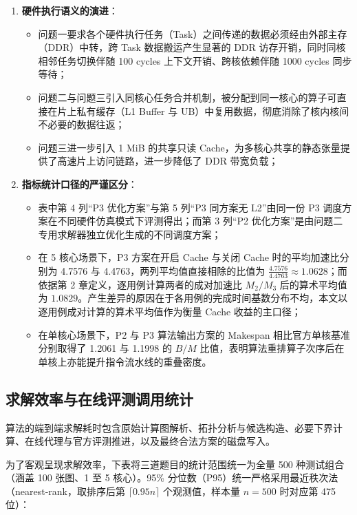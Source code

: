 \documentclass[anonymous,notoc]{gmcm2026}
\providecommand{\tightlist}{\setlength{\itemsep}{0pt}\setlength{\parskip}{0pt}}
\begin{document}
\begin{enumerate}
\def\labelenumi{\arabic{enumi}.}
\tightlist
\item
  \textbf{硬件执行语义的演进}：

  \begin{itemize}
  \tightlist
  \item
    问题一要求各个硬件执行任务（Task）之间传递的数据必须经由外部主存（DDR）中转，跨 Task 数据搬运产生显著的 DDR 访存开销，同时同核相邻任务切换伴随 100 cycles 上下文开销、跨核依赖伴随 1000 cycles 同步等待；
  \item
    问题二与问题三引入同核心任务合并机制，被分配到同一核心的算子可直接在片上私有缓存（L1 Buffer 与 UB）中复用数据，彻底消除了核内核间不必要的数据往返；
  \item
    问题三进一步引入 1 MiB 的共享只读 Cache，为多核心共享的静态张量提供了高速片上访问链路，进一步降低了 DDR 带宽负载；
  \end{itemize}
\item
  \textbf{指标统计口径的严谨区分}：

  \begin{itemize}
  \tightlist
  \item
    表中第 4 列``P3 优化方案''与第 5 列``P3 同方案无 L2''由同一份 P3 调度方案在不同硬件仿真模式下评测得出；而第 3 列``P2 优化方案''是由问题二专用求解器独立优化生成的不同调度方案；
  \item
    在 5 核心场景下，P3 方案在开启 Cache 与关闭 Cache 时的平均加速比分别为 4.7576 与 4.4763，两列平均值直接相除的比值为 \(\frac{4.7576}{4.4763} \approx 1.0628\)；而依据第 2 章定义，逐用例计算两者的成对加速比 \(M_2/M_3\) 后的算术平均值为 \(1.0829\)。产生差异的原因在于各用例的完成时间基数分布不均，本文以逐用例成对计算的算术平均值作为衡量 Cache 收益的主口径；
  \item
    在单核心场景下，P2 与 P3 算法输出方案的 Makespan 相比官方单核基准分别取得了 1.2061 与 1.1998 的 \(B/M\) 比值，表明算法重排算子次序后在单核上亦能提升指令流水线的重叠密度。
  \end{itemize}
\end{enumerate}

\subsection{求解效率与在线评测调用统计}

算法的端到端求解耗时包含原始计算图解析、拓扑分析与候选构造、必要下界计算、在线代理与官方评测推进，以及最终合法方案的磁盘写入。

为了客观呈现求解效率，下表将三道题目的统计范围统一为全量 500 种测试组合（涵盖 100 张图、1 至 5 核心）。95\% 分位数（P95）统一严格采用最近秩次法（nearest-rank，取排序后第 \(\lceil 0.95n \rceil\) 个观测值，样本量 \(n=500\) 时对应第 475 位）：
\end{document}
